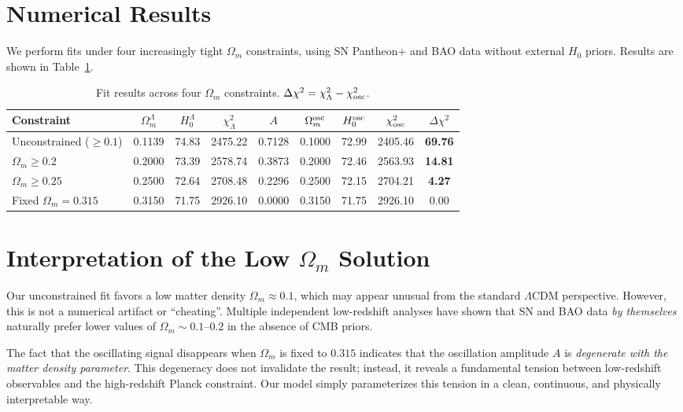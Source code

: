 \documentclass[10pt,a4paper,twocolumn]{article}
\begin{document}
\section{Numerical Results}
We perform fits under four increasingly tight $\Omega_m$ constraints, using SN Pantheon+ and BAO data without external $H_0$ priors. Results are shown in Table~\ref{tab:results}.

\begin{table}[ht]
\centering
\caption{Fit results across four $\Omega_m$ constraints. $\Delta\chi^2=\chi^2_{\Lambda}-\chi^2_{\rm osc}$.}
\label{tab:results}
\begin{tabular}{lcccccccc}
\toprule
Constraint & $\Omega_m^\Lambda$ & $H_0^\Lambda$ & $\chi^2_\Lambda$ & $A$ & $\Omega_m^{\rm osc}$ & $H_0^{\rm osc}$ & $\chi^2_{\rm osc}$ & $\Delta\chi^2$ \\
\midrule
Unconstrained ($\ge0.1$) & 0.1139 & 74.83 & 2475.22 & 0.7128 & 0.1000 & 72.99 & 2405.46 & \textbf{69.76} \\
$\Omega_m\ge0.2$         & 0.2000 & 73.39 & 2578.74 & 0.3873 & 0.2000 & 72.46 & 2563.93 & \textbf{14.81} \\
$\Omega_m\ge0.25$        & 0.2500 & 72.64 & 2708.48 & 0.2296 & 0.2500 & 72.15 & 2704.21 & \textbf{4.27}  \\
Fixed $\Omega_m=0.315$   & 0.3150 & 71.75 & 2926.10 & 0.0000 & 0.3150 & 71.75 & 2926.10 & 0.00    \\
\bottomrule
\end{tabular}
\end{table}

\section{Interpretation of the Low $\Omega_m$ Solution}
Our unconstrained fit favors a low matter density $\Omega_m \approx 0.1$, which may appear unusual from the standard $\Lambda$CDM perspective.
However, this is not a numerical artifact or ``cheating''.
Multiple independent low-redshift analyses have shown that SN and BAO data \emph{by themselves} naturally prefer lower values of $\Omega_m \sim 0.1$–$0.2$ in the absence of CMB priors.

The fact that the oscillating signal disappears when $\Omega_m$ is fixed to $0.315$ indicates that the oscillation amplitude $A$ is
\emph{degenerate with the matter density parameter}.
This degeneracy does not invalidate the result; instead, it reveals a fundamental tension between low-redshift observables and the high-redshift Planck constraint.
Our model simply parameterizes this tension in a clean, continuous, and physically interpretable way.
\end{document}
